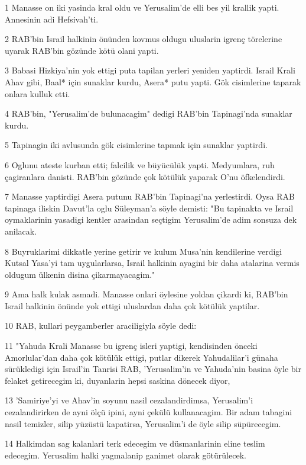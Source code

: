 \par 1 Manasse on iki yasinda kral oldu ve Yerusalim'de elli bes yil krallik yapti. Annesinin adi Hefsivah'ti.
\par 2 RAB'bin Israil halkinin önünden kovmus oldugu uluslarin igrenç törelerine uyarak RAB'bin gözünde kötü olani yapti.
\par 3 Babasi Hizkiya'nin yok ettigi puta tapilan yerleri yeniden yaptirdi. Israil Krali Ahav gibi, Baal* için sunaklar kurdu, Asera* putu yapti. Gök cisimlerine taparak onlara kulluk etti.
\par 4 RAB'bin, "Yerusalim'de bulunacagim" dedigi RAB'bin Tapinagi'nda sunaklar kurdu.
\par 5 Tapinagin iki avlusunda gök cisimlerine tapmak için sunaklar yaptirdi.
\par 6 Oglunu ateste kurban etti; falcilik ve büyücülük yapti. Medyumlara, ruh çagiranlara danisti. RAB'bin gözünde çok kötülük yaparak O'nu öfkelendirdi.
\par 7 Manasse yaptirdigi Asera putunu RAB'bin Tapinagi'na yerlestirdi. Oysa RAB tapinaga iliskin Davut'la oglu Süleyman'a söyle demisti: "Bu tapinakta ve Israil oymaklarinin yasadigi kentler arasindan seçtigim Yerusalim'de adim sonsuza dek anilacak.
\par 8 Buyruklarimi dikkatle yerine getirir ve kulum Musa'nin kendilerine verdigi Kutsal Yasa'yi tam uygularlarsa, Israil halkinin ayagini bir daha atalarina vermis oldugum ülkenin disina çikarmayacagim."
\par 9 Ama halk kulak asmadi. Manasse onlari öylesine yoldan çikardi ki, RAB'bin Israil halkinin önünde yok ettigi uluslardan daha çok kötülük yaptilar.
\par 10 RAB, kullari peygamberler araciligiyla söyle dedi:
\par 11 "Yahuda Krali Manasse bu igrenç isleri yaptigi, kendisinden önceki Amorlular'dan daha çok kötülük ettigi, putlar dikerek Yahudalilar'i günaha sürükledigi için Israil'in Tanrisi RAB, 'Yerusalim'in ve Yahuda'nin basina öyle bir felaket getirecegim ki, duyanlarin hepsi saskina dönecek diyor,
\par 13 'Samiriye'yi ve Ahav'in soyunu nasil cezalandirdimsa, Yerusalim'i cezalandirirken de ayni ölçü ipini, ayni çekülü kullanacagim. Bir adam tabagini nasil temizler, silip yüzüstü kapatirsa, Yerusalim'i de öyle silip süpürecegim.
\par 14 Halkimdan sag kalanlari terk edecegim ve düsmanlarinin eline teslim edecegim. Yerusalim halki yagmalanip ganimet olarak götürülecek.
